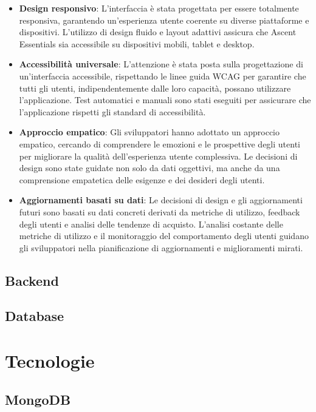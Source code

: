 \documentclass[12pt,a4paper,openright,twoside]{book}
\begin{document}
\begin{itemize}
    \item \textbf{Design responsivo}: L'interfaccia è stata progettata per essere totalmente responsiva, garantendo un'esperienza utente coerente su diverse piattaforme e dispositivi. L'utilizzo di design fluido e layout adattivi assicura che Ascent Essentials sia accessibile su dispositivi mobili, tablet e desktop.
    \item \textbf{Accessibilità universale}: L'attenzione è stata posta sulla progettazione di un'interfaccia accessibile, rispettando le linee guida WCAG per garantire che tutti gli utenti, indipendentemente dalle loro capacità, possano utilizzare l'applicazione. Test automatici e manuali sono stati eseguiti per assicurare che l'applicazione rispetti gli standard di accessibilità.
    \item \textbf{Approccio empatico}: Gli sviluppatori hanno adottato un approccio empatico, cercando di comprendere le emozioni e le prospettive degli utenti per migliorare la qualità dell'esperienza utente complessiva. Le decisioni di design sono state guidate non solo da dati oggettivi, ma anche da una comprensione empatetica delle esigenze e dei desideri degli utenti.
    \item \textbf{Aggiornamenti basati su dati}: Le decisioni di design e gli aggiornamenti futuri sono basati su dati concreti derivati da metriche di utilizzo, feedback degli utenti e analisi delle tendenze di acquisto. L'analisi costante delle metriche di utilizzo e il monitoraggio del comportamento degli utenti guidano gli sviluppatori nella pianificazione di aggiornamenti e miglioramenti mirati.
\end{itemize}

\section{Backend}

\section{Database}


\chapter{Tecnologie}

\section{MongoDB}
\end{document}
